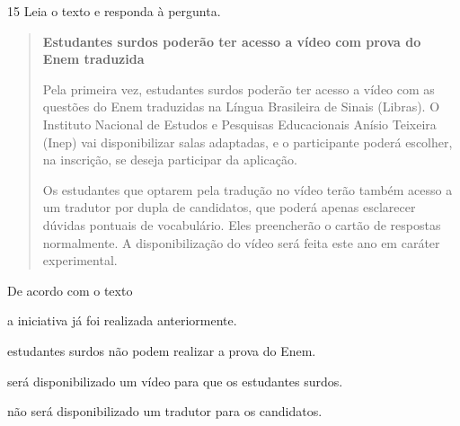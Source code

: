 \begin{escolha}
\num{15} Leia o texto e responda à pergunta.

\begin{quote}
\textbf{Estudantes surdos poderão ter acesso a vídeo com prova do Enem
traduzida}

Pela primeira vez, estudantes surdos poderão ter acesso a vídeo com as
questões do Enem traduzidas na Língua Brasileira de Sinais (Libras). O
Instituto Nacional de Estudos e Pesquisas Educacionais Anísio Teixeira
(Inep) vai disponibilizar salas adaptadas, e o participante poderá
escolher, na inscrição, se deseja participar da aplicação.

Os estudantes que optarem pela tradução no vídeo terão também acesso a
um tradutor por dupla de candidatos, que poderá apenas esclarecer
dúvidas pontuais de vocabulário. Eles preencherão o cartão de respostas
normalmente. A disponibilização do vídeo será feita este ano em caráter
experimental.
\end{quote}


De acordo com o texto

\begin{escolha}
  \item a iniciativa já foi realizada anteriormente.

  \item estudantes surdos não podem realizar a prova do Enem.

  \item será disponibilizado um vídeo para que os estudantes surdos.

  \item não será disponibilizado um tradutor para os candidatos.
\end{escolha}

\end{escolha}
